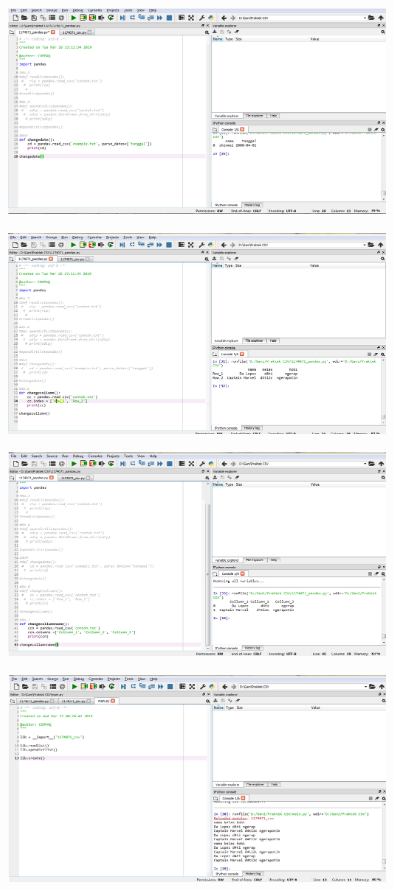\begin{figure}[ht]
	\includegraphics[width=10cm]{figures/4/1174071/Praktek/1174071_pandas5.png}
	\centering
\end{figure}
\begin{figure}[ht]
	\includegraphics[width=10cm]{figures/4/1174071/Praktek/1174071_pandas6.png}
	\centering
\end{figure}
\begin{figure}[ht]
	\includegraphics[width=10cm]{figures/4/1174071/Praktek/1174071_pandas7.png}
	\centering
\end{figure}
\begin{figure}[ht]
	\includegraphics[width=10cm]{figures/4/1174071/Praktek/1174071_main8.png}
	\centering
\end{figure}
